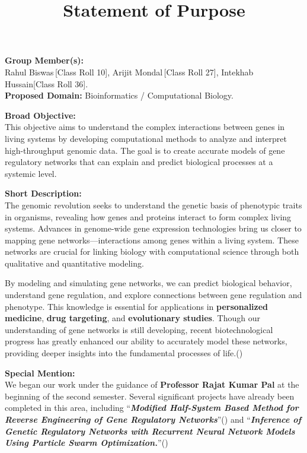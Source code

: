 \documentclass[a4paper,12pt]{article}
\title{\textbf{Statement of Purpose}}
\date{}
\begin{document}
\maketitle
\noindent
\textbf{Group Member(s):} \\
{\small Rahul Biswas\,[Class Roll 10], Arijit Mondal\,[Class Roll 27],
Intekhab Hussain[Class Roll 36].}\\

\noindent
\textbf{Proposed Domain:} 
Bioinformatics / Computational Biology.

\vspace{12pt}
\noindent
\textbf{Broad Objective:} \\
This objective aims to understand the complex interactions between genes in living systems by developing computational methods to analyze and interpret high-throughput genomic data. The goal is to create accurate models of gene regulatory networks that can explain and predict biological processes at a systemic level.

\vspace{12pt}
\noindent
\textbf{Short Description:} \\
The genomic revolution seeks to understand the genetic basis of phenotypic traits in organisms, revealing how genes and proteins interact to form complex living systems. Advances in genome-wide gene expression technologies bring us closer to mapping gene networks—interactions among genes within a living system. These networks are crucial for linking biology with computational science through both qualitative and quantitative modeling.

By modeling and simulating gene networks, we can predict biological behavior, understand gene regulation, and explore connections between gene regulation and phenotype. This knowledge is essential for applications in \textbf{personalized medicine}, \textbf{drug targeting}, and \textbf{evolutionary studies}. Though our understanding of gene networks is still developing, recent biotechnological progress has greatly enhanced our ability to accurately model these networks, providing deeper insights into the fundamental processes of life.(\cite{aluru2005handbook})

\vspace{12pt}
\noindent
\textbf{Special Mention:} \\
We began our work under the guidance of \textbf{Professor Rajat Kumar Pal} at the beginning of the second semester. Several significant projects have already been completed in this area, including \enquote{\textit{\textbf{Modified Half-System Based Method for Reverse Engineering of Gene Regulatory Networks}}}(\cite{Half-system}) and \enquote{\textit{\textbf{Inference of Genetic Regulatory Networks with Recurrent Neural Network Models Using Particle Swarm Optimization.}}}(\cite{RNN-model})
{\small
\printbibliography
}
\end{document}
